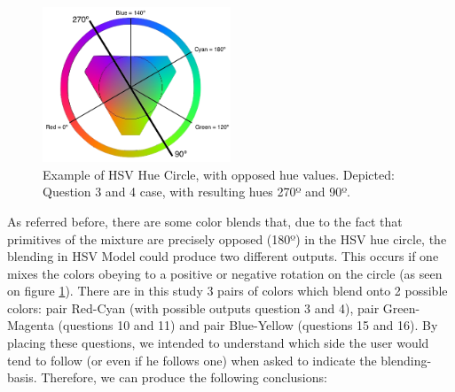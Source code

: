 %
\begin{figure}[htbp]
  \centering
  \includegraphics[width=0.5\textwidth]{images/HSV_hue.png}
  \caption[Example of HSV Hue Circle, with opposed hue values.]{Example of HSV Hue Circle, with opposed hue values. Depicted: Question 3 and 4 case, with resulting hues 270º and 90º.}
  \label{fig:hsvcircles_example}
\end{figure}
%
As referred before, there are some color blends that, due to the fact that primitives of the mixture are precisely opposed (180º) in the HSV hue circle, the blending in HSV Model could produce two different outputs. This occurs if one mixes the colors obeying to a positive or negative
rotation on the circle (as seen on figure \ref{fig:hsvcircles_example}). There are in this study 3 pairs of colors which blend onto 2 possible colors: pair Red-Cyan (with possible outputs question 3 and 4), pair Green-Magenta (questions 10 and 11) and pair Blue-Yellow (questions 15
and 16). By placing these questions, we intended to understand which side the user would tend to follow (or even if he follows one) when asked to indicate the blending-basis. Therefore, we can produce the following conclusions:
%
